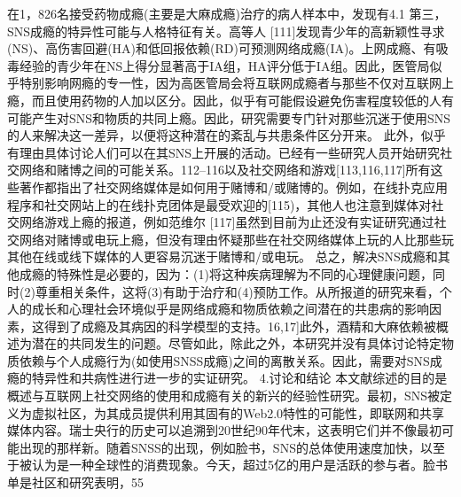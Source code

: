 在1，826名接受药物成瘾(主要是大麻成瘾)治疗的病人样本中，发现有4.1%
第三，SNS成瘾的特异性可能与人格特征有关。高等人 [111]发现青少年的高新颖性寻求(NS)、高伤害回避(HA)和低回报依赖(RD)可预测网络成瘾(IA)。上网成瘾、有吸毒经验的青少年在NS上得分显著高于IA组，HA评分低于IA组。因此，医管局似乎特别影响网瘾的专一性，因为高医管局会将互联网成瘾者与那些不仅对互联网上瘾，而且使用药物的人加以区分。因此，似乎有可能假设避免伤害程度较低的人有可能产生对SNS和物质的共同上瘾。因此，研究需要专门针对那些沉迷于使用SNS的人来解决这一差异，以便将这种潜在的紊乱与共患条件区分开来。
此外，似乎有理由具体讨论人们可以在其SNS上开展的活动。已经有一些研究人员开始研究社交网络和赌博之间的可能关系。112–116以及社交网络和游戏[113,116,117]所有这些著作都指出了社交网络媒体是如何用于赌博和/或赌博的。例如，在线扑克应用程序和社交网站上的在线扑克团体是最受欢迎的[115)，其他人也注意到媒体对社交网络游戏上瘾的报道，例如范维尔 [117]虽然到目前为止还没有实证研究通过社交网络对赌博或电玩上瘾，但没有理由怀疑那些在社交网络媒体上玩的人比那些玩其他在线或线下媒体的人更容易沉迷于赌博和/或电玩。
总之，解决SNS成瘾和其他成瘾的特殊性是必要的，因为：(1)将这种疾病理解为不同的心理健康问题，同时(2)尊重相关条件，这将(3)有助于治疗和(4)预防工作。从所报道的研究来看，个人的成长和心理社会环境似乎是网络成瘾和物质依赖之间潜在的共患病的影响因素，这得到了成瘾及其病因的科学模型的支持。16,17]此外，酒精和大麻依赖被概述为潜在的共同发生的问题。尽管如此，除此之外，本研究并没有具体讨论特定物质依赖与个人成瘾行为(如使用SNSS成瘾)之间的离散关系。因此，需要对SNS成瘾的特异性和共病性进行进一步的实证研究。
4.讨论和结论
本文献综述的目的是概述与互联网上社交网络的使用和成瘾有关的新兴的经验性研究。最初，SNS被定义为虚拟社区，为其成员提供利用其固有的Web2.0特性的可能性，即联网和共享媒体内容。瑞士央行的历史可以追溯到20世纪90年代末，这表明它们并不像最初可能出现的那样新。随着SNSS的出现，例如脸书，SNS的总体使用速度加快，以至于被认为是一种全球性的消费现象。今天，超过5亿的用户是活跃的参与者。脸书单是社区和研究表明，55%
